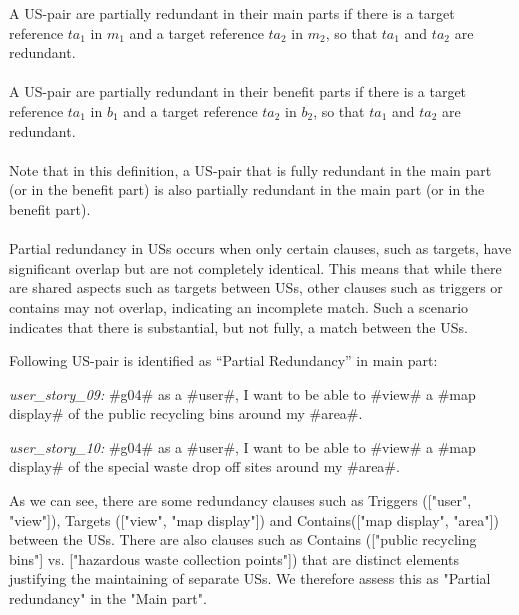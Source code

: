 \begin{definition}
	A US-pair are partially redundant in their main parts if there is a target reference $ta_1$ in $m_1$ and a target reference $ta_2$ in $m_2$, so that $ta_1$ and $ta_2$ are redundant.\\\\
	A US-pair are partially redundant in their benefit parts if there is a target reference $ta_1$ in $b_1$ and a target reference $ta_2$ in $b_2$, so that $ta_1$ and $ta_2$ are redundant.\\\\
	Note that in this definition, a US-pair that is fully redundant in the main part (or in the benefit part) is also partially redundant in the main part (or in the benefit part).\\\\
	Partial redundancy in USs occurs when only certain clauses, such as targets, have significant overlap but are not completely identical. This means that while there are shared aspects such as targets between USs, other clauses such as triggers or contains may not overlap, indicating an incomplete match. Such a scenario indicates that there is substantial, but not fully, a match between the USs.
\end{definition}
\begin{example}
	Following US-pair is identified as \enquote{Partial Redundancy} in main part:
	
	\textit{user\_story\_09:} \#g04\# as a \#user\#, I want to be able to \#view\# a \#map display\# of the public recycling bins around my \#area\#.
	
	\textit{user\_story\_10:} \#g04\# as a \#user\#, I want to be able to \#view\# a \#map display\# of the special waste drop off sites around my \#area\#.
	
	As we can see, there are some redundancy clauses such as Triggers (["user", "view"]), Targets (["view", "map display"]) and Contains(["map display", "area"]) between the USs. There are also clauses such as Contains (["public recycling bins"] vs. ["hazardous waste collection points"]) that are distinct elements justifying the maintaining of separate USs. We therefore assess this as "Partial redundancy" in the "Main part".
\end{example}
